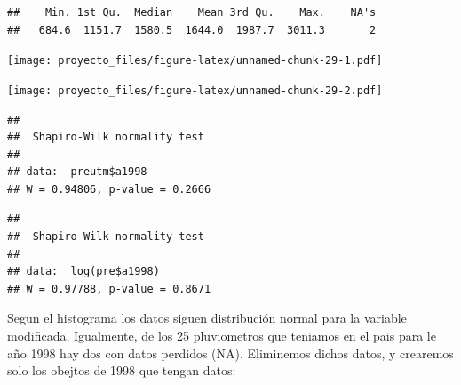 \documentclass[11pt,]{article}
\newenvironment{Shaded}{\begin{snugshade}}{\end{snugshade}}
\newcommand{\KeywordTok}[1]{\textcolor[rgb]{0.13,0.29,0.53}{\textbf{#1}}}
\newcommand{\OperatorTok}[1]{\textcolor[rgb]{0.81,0.36,0.00}{\textbf{#1}}}
\newcommand{\NormalTok}[1]{#1}
\begin{document}
\begin{verbatim}
##    Min. 1st Qu.  Median    Mean 3rd Qu.    Max.    NA's 
##   684.6  1151.7  1580.5  1644.0  1987.7  3011.3       2
\end{verbatim}

\begin{Shaded}
\end{Shaded}

\texttt{[image: proyecto\_files/figure-latex/unnamed-chunk-29-1.pdf]}

\begin{Shaded}
\end{Shaded}

\texttt{[image: proyecto\_files/figure-latex/unnamed-chunk-29-2.pdf]}

\begin{Shaded}
\end{Shaded}

\begin{verbatim}
## 
##  Shapiro-Wilk normality test
## 
## data:  preutm$a1998
## W = 0.94806, p-value = 0.2666
\end{verbatim}

\begin{Shaded}
\end{Shaded}

\begin{verbatim}
## 
##  Shapiro-Wilk normality test
## 
## data:  log(pre$a1998)
## W = 0.97788, p-value = 0.8671
\end{verbatim}

Segun el histograma los datos siguen distribución normal para la
variable modificada, Igualmente, de los 25 pluviometros que teniamos en
el pais para le año 1998 hay dos con datos perdidos (NA). Eliminemos
dichos datos, y crearemos solo los obejtos de 1998 que tengan datos:
\end{document}
